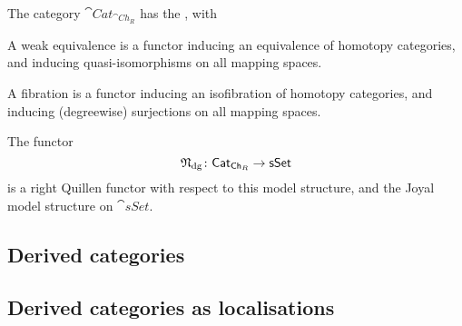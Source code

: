 \begin{theorem}
    The category $\cat{Cat}_{\cat{Ch}_R}$ has the , with
    \begin{itms}
        \item A weak equivalence is a functor inducing an equivalence of 
        homotopy categories, and inducing quasi-isomorphisms on all mapping spaces.
        \item A fibration is a functor inducing an isofibration of 
        homotopy categories, and inducing (degreewise) surjections on all mapping spaces.
    \end{itms}
    The functor
    \[\mathfrak{N}_{\mathrm{dg}}\colon\mathsf{Cat}_{\mathsf{Ch}_R}\to\mathsf{sSet}\]
    is a right Quillen functor with respect to this model structure,
    and the Joyal model structure on $\cat{sSet}$.
\end{theorem}

\subsection{Derived categories}

\nyw 

\subsection{Derived categories as localisations}

\nyw 
